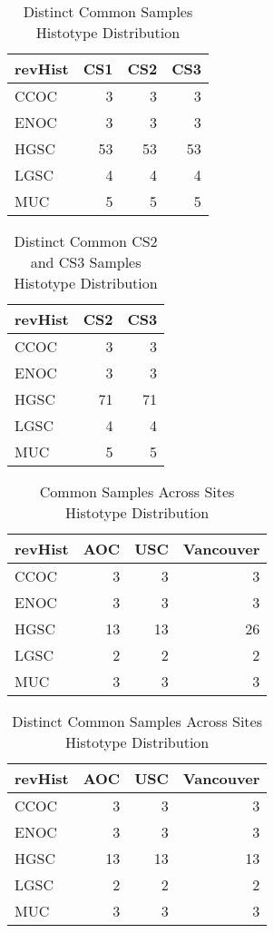 \documentclass[
]{report}
\begin{document}
\begin{table}

\caption{\label{tab:common-dist-distinct}Distinct Common Samples Histotype Distribution}
\centering
\begin{tabular}[t]{l|r|r|r}
\hline
revHist & CS1 & CS2 & CS3\\
\hline
CCOC & 3 & 3 & 3\\
\hline
ENOC & 3 & 3 & 3\\
\hline
HGSC & 53 & 53 & 53\\
\hline
LGSC & 4 & 4 & 4\\
\hline
MUC & 5 & 5 & 5\\
\hline
\end{tabular}
\end{table}

\begin{table}

\caption{\label{tab:common-cs2-cs3-dist-distinct}Distinct Common CS2 and CS3 Samples Histotype Distribution}
\centering
\begin{tabular}[t]{l|r|r}
\hline
revHist & CS2 & CS3\\
\hline
CCOC & 3 & 3\\
\hline
ENOC & 3 & 3\\
\hline
HGSC & 71 & 71\\
\hline
LGSC & 4 & 4\\
\hline
MUC & 5 & 5\\
\hline
\end{tabular}
\end{table}

\begin{table}

\caption{\label{tab:common-dist-sites}Common Samples Across Sites Histotype Distribution}
\centering
\begin{tabular}[t]{l|r|r|r}
\hline
revHist & AOC & USC & Vancouver\\
\hline
CCOC & 3 & 3 & 3\\
\hline
ENOC & 3 & 3 & 3\\
\hline
HGSC & 13 & 13 & 26\\
\hline
LGSC & 2 & 2 & 2\\
\hline
MUC & 3 & 3 & 3\\
\hline
\end{tabular}
\end{table}

\begin{table}

\caption{\label{tab:common-dist-sites-distinct}Distinct Common Samples Across Sites Histotype Distribution}
\centering
\begin{tabular}[t]{l|r|r|r}
\hline
revHist & AOC & USC & Vancouver\\
\hline
CCOC & 3 & 3 & 3\\
\hline
ENOC & 3 & 3 & 3\\
\hline
HGSC & 13 & 13 & 13\\
\hline
LGSC & 2 & 2 & 2\\
\hline
MUC & 3 & 3 & 3\\
\hline
\end{tabular}
\end{table}
\end{document}
